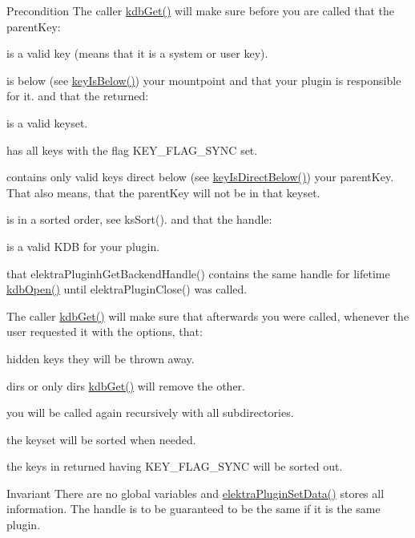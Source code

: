 \begin{DoxyPrecond}{Precondition}
The caller \hyperlink{group__kdb_ga28e385fd9cb7ccfe0b2f1ed2f62453a1}{kdbGet()} will make sure before you are called that the parentKey:
\begin{DoxyItemize}
\item is a valid key (means that it is a system or user key).
\item is below (see \hyperlink{group__keytest_ga03332b5d97c76a4fd2640aca4762b8df}{keyIsBelow()}) your mountpoint and that your plugin is responsible for it. and that the returned:
\item is a valid keyset.
\item has {\ttfamily all} keys with the flag KEY\_\-FLAG\_\-SYNC set.
\item contains only valid keys direct below (see \hyperlink{group__keytest_ga4f175aafd98948ce6c774f3bd92b72ca}{keyIsDirectBelow()}) your parentKey. That also means, that the parentKey will not be in that keyset.
\item is in a sorted order, see ksSort(). and that the handle:
\begin{DoxyItemize}
\item is a valid KDB for your plugin.
\item that elektraPluginhGetBackendHandle() contains the same handle for lifetime \hyperlink{group__kdb_ga6808defe5870f328dd17910aacbdc6ca}{kdbOpen()} until elektraPluginClose() was called.
\end{DoxyItemize}
\end{DoxyItemize}

The caller \hyperlink{group__kdb_ga28e385fd9cb7ccfe0b2f1ed2f62453a1}{kdbGet()} will make sure that afterwards you were called, whenever the user requested it with the options, that:
\begin{DoxyItemize}
\item hidden keys they will be thrown away.
\item dirs or only dirs \hyperlink{group__kdb_ga28e385fd9cb7ccfe0b2f1ed2f62453a1}{kdbGet()} will remove the other.
\item you will be called again recursively with all subdirectories.
\item the keyset will be sorted when needed.
\item the keys in returned having KEY\_\-FLAG\_\-SYNC will be sorted out.
\end{DoxyItemize}
\end{DoxyPrecond}
\begin{DoxyInvariant}{Invariant}
There are no global variables and \hyperlink{group__plugin_gaf4b941a52ff55d0ca2a9158d90208ef2}{elektraPluginSetData()} stores all information. The handle is to be guaranteed to be the same if it is the same plugin.
\end{DoxyInvariant}
